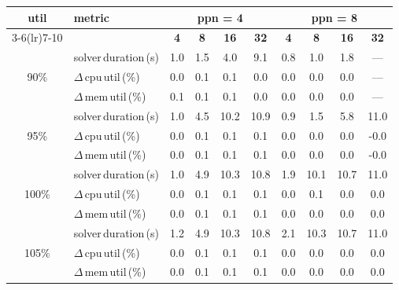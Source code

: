 \begin{tabular}{@{}c l *{8}{c}@{}}
\toprule
\multirow{2}{*}{\textbf{util}} & \multirow{2}{*}{\textbf{metric}} &\multicolumn{4}{c}{\textbf{ppn = 4}} & \multicolumn{4}{c}{\textbf{ppn = 8}}\\
\cmidrule(lr){3-6}\cmidrule(lr){7-10}
 &  & \textbf{4} & \textbf{8} & \textbf{16} & \textbf{32} & \textbf{4} & \textbf{8} & \textbf{16} & \textbf{32}\\
\midrule
\multirow{3}{*}{90\%}
& solver\,duration\,(s) & 1.0 & 1.5 & 4.0 & 9.1 & 0.8 & 1.0 & 1.8 & \multicolumn{1}{c}{—} \\
& $\Delta$\,cpu\,util\,(\%) & 0.0 & 0.1 & 0.1 & 0.0 & 0.0 & 0.0 & 0.0 & \multicolumn{1}{c}{—} \\
& $\Delta$\,mem\,util\,(\%) & 0.1 & 0.1 & 0.1 & 0.0 & 0.0 & 0.0 & 0.0 & \multicolumn{1}{c}{—} \\
\midrule
\multirow{3}{*}{95\%}
& solver\,duration\,(s) & 1.0 & 4.5 & 10.2 & 10.9 & 0.9 & 1.5 & 5.8 & 11.0 \\
& $\Delta$\,cpu\,util\,(\%) & 0.0 & 0.1 & 0.1 & 0.1 & 0.0 & 0.0 & 0.0 & -0.0 \\
& $\Delta$\,mem\,util\,(\%) & 0.0 & 0.1 & 0.1 & 0.1 & 0.0 & 0.0 & 0.0 & -0.0 \\
\midrule
\multirow{3}{*}{100\%}
& solver\,duration\,(s) & 1.0 & 4.9 & 10.3 & 10.8 & 1.9 & 10.1 & 10.7 & 11.0 \\
& $\Delta$\,cpu\,util\,(\%) & 0.0 & 0.1 & 0.1 & 0.1 & 0.0 & 0.1 & 0.0 & 0.0 \\
& $\Delta$\,mem\,util\,(\%) & 0.0 & 0.1 & 0.1 & 0.1 & 0.0 & 0.0 & 0.0 & 0.0 \\
\midrule
\multirow{3}{*}{105\%}
& solver\,duration\,(s) & 1.2 & 4.9 & 10.3 & 10.8 & 2.1 & 10.3 & 10.7 & 11.0 \\
& $\Delta$\,cpu\,util\,(\%) & 0.0 & 0.1 & 0.1 & 0.1 & 0.0 & 0.0 & 0.0 & 0.0 \\
& $\Delta$\,mem\,util\,(\%) & 0.0 & 0.1 & 0.1 & 0.1 & 0.0 & 0.0 & 0.0 & 0.0 \\
\bottomrule
\end{tabular}
